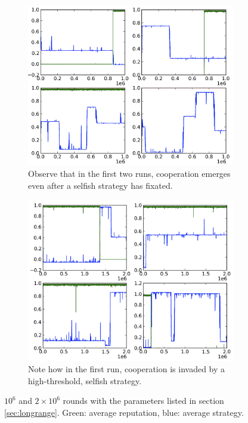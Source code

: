 \documentclass{amsart}
\begin{document}
\begin{figure}[h!tbp]
  \begin{subfigure}{.485\linewidth}
    \includegraphics[width=\linewidth]{really.png}
    \caption{Observe that in the first two runs, cooperation emerges
      even after a selfish strategy has fixated.}
    \label{fig:really}
  \end{subfigure}
  \hspace{.01\linewidth}
  \begin{subfigure}{.485\linewidth}
    \includegraphics[width=\linewidth]{what.png}
    \caption{Note how in the first run, cooperation is invaded by a
      high-threshold, selfish strategy.}
    \label{fig:what}
  \end{subfigure}
    \caption{$10^6$ and $2 \times 10^6$ rounds with the parameters
      listed in section \ref{sec:longrange}. Green: average
      reputation, blue: average strategy.}
\end{figure}
\end{document}
